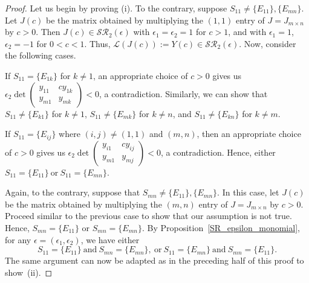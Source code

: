 \documentclass[11pt,reqno]{amsart}
\theoremstyle{plain}
\theoremstyle{definition}
\numberwithin{equation}{section}
\begin{document}
\begin{proof}
	Let us begin by proving (i). To the contrary, suppose $S_{11}\neq\{E_{11}\}, \{E_{mn}\}$. Let $J(c)$ be the matrix obtained by multiplying the $(1,1)$ entry of $J=J_{m\times n}$ by $c>0$. Then $J(c)\in \mathcal{SR}_2(\epsilon)$ with $\epsilon_1=\epsilon_2=1$ for $c>1$, and with $\epsilon_1=1$, $\epsilon_2=-1$ for $0<c<1$. Thus, $\mathcal{L}(J(c)):=Y(c)\in \mathcal{SR}_2(\epsilon)$. Now, consider the following cases.
	
	If $S_{11}=\{E_{1k}\}$ for $k\neq 1$, an appropriate choice of $c>0$ gives us $\epsilon_2\det\begin{pmatrix}
		y_{11} & cy_{1k} \\
		y_{m1} & y_{mk}
	\end{pmatrix}<0$, a contradiction. Similarly, we can show that $S_{11}\neq\{E_{k1}\}$ for $k\neq1$, $S_{11}\neq\{E_{mk}\}$ for $k\neq n$, and $S_{11}\neq\{E_{kn}\}$ for $k\neq m$. 
	
	If $S_{11}=\{E_{ij}\}$ where $(i,j)\neq(1,1)$ and $(m,n)$, then an appropriate choice of $c>0$ gives us $\epsilon_2\det\begin{pmatrix}
		y_{i1} & cy_{ij} \\
		y_{m1} & y_{mj}
	\end{pmatrix}<0$, a contradiction. Hence, either $S_{11}=\{E_{11}\}~ \text{or} ~ S_{11}=\{E_{mn}\}$. \smallskip
	
	Again, to the contrary, suppose that $S_{mn}\neq\{E_{11}\}, \{E_{mn}\}$. In this case, let $J(c)$ be the matrix obtained by multiplying the $(m,n)$ entry of $J=J_{m\times n}$ by $c>0$. Proceed similar to the previous case to show that our assumption is not true. Hence, $S_{mn}=\{E_{11}\}$ or
	$S_{mn}=\{E_{mn}\}$. By Proposition~\ref{SR_epsilon_monomial}, for any $\epsilon=(\epsilon_1,\epsilon_2)$, we have either 
	\[S_{11}=\{E_{11}\}~ \text{and} ~ S_{mn}=\{E_{mn}\}, ~ \text{or} ~ S_{11}=\{E_{mn}\} ~ \text{and} ~ S_{mn}=\{E_{11}\}.\] 
	The same argument can now be adapted as in the preceding half of this proof to show~(ii).
\end{proof}
\end{document}
